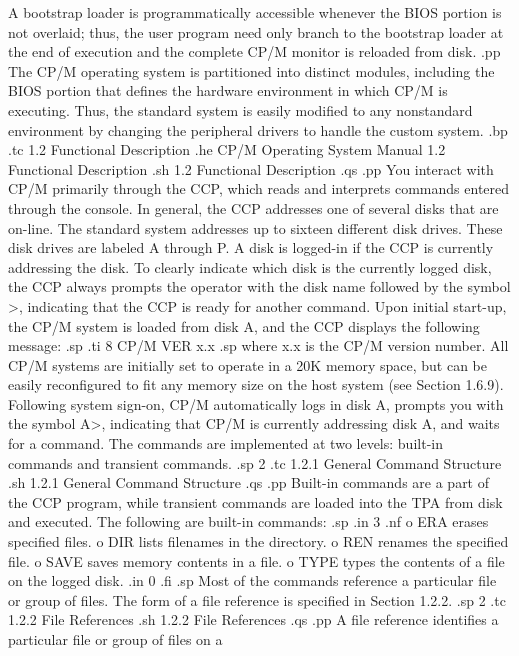 A bootstrap loader is programmatically accessible whenever the BIOS portion
is not overlaid; thus, the user program need only branch to the bootstrap
loader at the end of execution and the complete CP/M monitor is reloaded
from disk.
.pp
The CP/M operating system is partitioned into distinct modules, including
the BIOS portion that defines the hardware environment in which CP/M is
executing.  Thus, the standard system is easily modified to any nonstandard
environment by changing the peripheral drivers to handle the custom system.
.bp
.tc    1.2  Functional Description
.he CP/M Operating System Manual          1.2  Functional Description
.sh
1.2  Functional Description
.qs
.pp
You interact with CP/M primarily through the CCP, which reads and
interprets commands entered through the console.  In general, the CCP
addresses one of several disks that are on-line.  The standard system
addresses up to sixteen different disk drives.  These disk drives are
labeled A through P.  A disk is logged-in if the CCP is currently
addressing the disk.  To clearly indicate which disk is the currently logged
disk, the CCP always prompts the operator with the disk name followed by the
symbol >, indicating that the CCP is ready for another command.  Upon
initial start-up, the CP/M system is loaded from disk A, and the CCP
displays the following message:
.sp
.ti 8
CP/M VER x.x
.sp
where x.x is the CP/M version number.  All CP/M systems are initially set
to operate in a 20K memory space, but can be easily reconfigured to fit any
memory size on the host system (see Section 1.6.9).  Following system
sign-on, CP/M automatically logs in disk A, prompts you with the
symbol A>, indicating that CP/M is currently addressing disk A, and
waits for a command.  The commands are implemented at two levels:  built-in
commands and transient commands.
.sp 2
.tc         1.2.1  General Command Structure
.sh
1.2.1  General Command Structure
.qs
.pp
Built-in commands are a part of the CCP program, while transient
commands are loaded into the TPA from disk and executed.  The 
following are built-in commands:
.sp
.in 3
.nf
o ERA erases specified files.
o DIR lists filenames in the directory.
o REN renames the specified file.
o SAVE saves memory contents in a file.
o TYPE types the contents of a file on the logged disk.
.in 0
.fi
.sp
Most of the commands reference a particular file or group of files.  The
form of a file reference is specified in Section 1.2.2.
.sp 2
.tc         1.2.2  File References
.sh
1.2.2  File References
.qs
.pp
A file reference identifies a particular file or group of files on a
